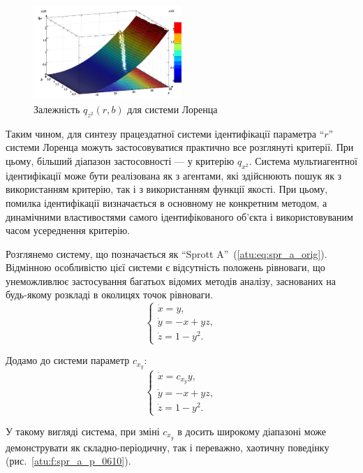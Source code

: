 \documentclass[a4paper,13pt]{atuaref}
\begin{document}
\begin{figure}[ht!]
  \centerline{  \includegraphics[width=0.50\textwidth]{p5/p/cha/lor/q2d/lor_qz2_r_b.png}  }
  \caption{Залежність $q_{z^2}(r,b)$ для системи Лоренца}
  \label{atu:f:lor_qz2_r_b}
\end{figure}


Таким чином,
для синтезу працездатної системи ідентифікації параметра ``$r$'' системи
Лоренца можуть застосовуватися практично все розглянуті критерії. При цьому,
більший діапазон застосовності --- у критерію  $q_{x^2}$.
Система мультиагентної ідентифікації може бути реалізована як з агентами, які
здійснюють пошук як з використанням критерію, так і з використанням функції
якості. При цьому, помилка ідентифікації визначається в основному не конкретним
методом, а динамічними властивостями самого ідентифікованого об'єкта і
використовуваним часом усереднення критерію.


Розглянемо систему, що позначається як ``Sprott A''~(\ref{atu:eq:spr_a_orig}). Відмінною
особливістю цієї системи є відсутність положень рівноваги, що унеможливлює
застосування багатьох відомих методів аналізу, заснованих на будь-якому
розкладі в околицях точок рівноваги.
%
\begin{equation}
  \begin{cases}
    \dot{x} =  y, \\
    \dot{y} = -x + yz, \\
    \dot{z} =  1 - y^2.
  \end{cases}
  \label{atu:eq:spr_a_orig}
\end{equation}

Додамо до системи параметр $c_{x_y}$:
%
\begin{equation}
  \begin{cases}
    \dot{x} =  c_{x_y} y, \\
    \dot{y} = -x + yz, \\
    \dot{z} =  1 - y^2.
  \end{cases}
  \label{atu:eq:spr_a}
\end{equation}

У такому вигляді система, при зміні $c_{x_y} $ в досить широкому діапазоні
може демонструвати як складно-періодичну, так і переважно, хаотичну поведінку
(рис.~\ref{atu:f:spr_a_p_0610}).
\end{document}
